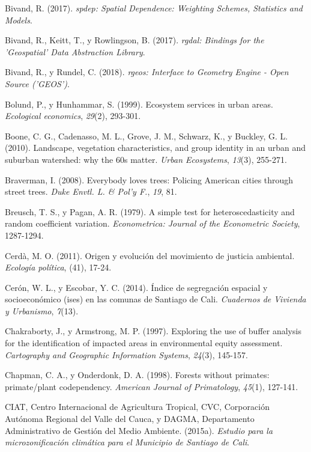 \documentclass[12pt,a4paper,openany]{book}
\theoremstyle{definition}
\theoremstyle{definition}
\theoremstyle{definition}
\theoremstyle{remark}
\begin{document}
\hypertarget{ref-R-spdep}{}
Bivand, R. (2017). \emph{spdep: Spatial Dependence: Weighting Schemes,
Statistics and Models}.

\hypertarget{ref-R-rgdal}{}
Bivand, R., Keitt, T., y Rowlingson, B. (2017). \emph{rgdal: Bindings
for the 'Geospatial' Data Abstraction Library}.

\hypertarget{ref-R-rgeos}{}
Bivand, R., y Rundel, C. (2018). \emph{rgeos: Interface to Geometry
Engine - Open Source ('GEOS')}.

\hypertarget{ref-bolund_ecosystem_1999}{}
Bolund, P., y Hunhammar, S. (1999). Ecosystem services in urban areas.
\emph{Ecological economics}, \emph{29}(2), 293-301.

\hypertarget{ref-boone2010landscape}{}
Boone, C. G., Cadenasso, M. L., Grove, J. M., Schwarz, K., y Buckley, G.
L. (2010). Landscape, vegetation characteristics, and group identity in
an urban and suburban watershed: why the 60s matter. \emph{Urban
Ecosystems}, \emph{13}(3), 255-271.

\hypertarget{ref-braverman_everybody_2008}{}
Braverman, I. (2008). Everybody loves trees: Policing American cities
through street trees. \emph{Duke Envtl. L. \& Pol'y F.}, \emph{19}, 81.

\hypertarget{ref-breusch1979simple}{}
Breusch, T. S., y Pagan, A. R. (1979). A simple test for
heteroscedasticity and random coefficient variation. \emph{Econometrica:
Journal of the Econometric Society}, 1287-1294.

\hypertarget{ref-cerda_origen_2011}{}
Cerdà, M. O. (2011). Origen y evolución del movimiento de justicia
ambiental. \emph{Ecología política}, (41), 17-24.

\hypertarget{ref-ceron_indice_2014}{}
Cerón, W. L., y Escobar, Y. C. (2014). Índice de segregación espacial y
socioeconómico (ises) en las comunas de Santiago de Cali.
\emph{Cuadernos de Vivienda y Urbanismo}, \emph{7}(13).

\hypertarget{ref-chakraborty1997exploring}{}
Chakraborty, J., y Armstrong, M. P. (1997). Exploring the use of buffer
analysis for the identification of impacted areas in environmental
equity assessment. \emph{Cartography and Geographic Information
Systems}, \emph{24}(3), 145-157.

\hypertarget{ref-chapman_forests_1998}{}
Chapman, C. A., y Onderdonk, D. A. (1998). Forests without primates:
primate/plant codependency. \emph{American Journal of Primatology},
\emph{45}(1), 127-141.

\hypertarget{ref-ciat_microzona_2015}{}
CIAT, Centro Internacional de Agricultura Tropical, CVC, Corporación
Autónoma Regional del Valle del Cauca, y DAGMA, Departamento
Administrativo de Gestión del Medio Ambiente. (2015a). \emph{Estudio
para la microzonificación climática para el Municipio de Santiago de
Cali}.
\end{document}
